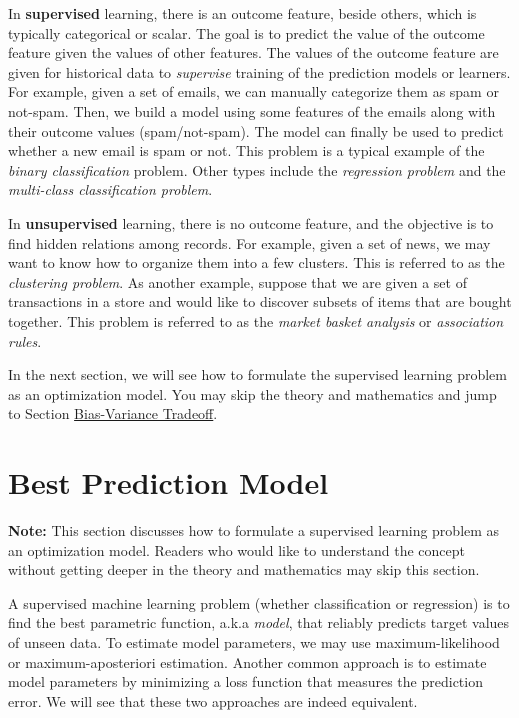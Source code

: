 \documentclass[11pt]{article}
\begin{document}
In \textbf{supervised} learning, there is an outcome feature, beside others, which is typically categorical or scalar. The goal is to predict the value of the outcome feature given the values of other features. The values of the outcome feature are given for historical data to \emph{supervise} training of the prediction models or learners. For example, given a set of emails, we can manually categorize them as spam or not-spam. Then, we build a model using some features of the emails along with their outcome values (spam/not-spam). The model can finally be used to predict whether a new email is spam or not. This problem is a typical example of the \emph{binary classification} problem. Other types include the \emph{regression problem} and the \emph{multi-class classification problem}.

In \textbf{unsupervised} learning, there is no outcome feature, and the objective is to find hidden relations among records. For example, given a set of news, we may want to know how to organize them into a few clusters. This is referred to as the \emph{clustering problem}. As another example, suppose that we are given a set of transactions in a store and would like to discover subsets of items that are bought together. This problem is referred to as the \emph{market basket analysis} or \emph{association rules}.

In the next section, we will see how to formulate the supervised learning problem as an optimization model. You may skip the theory and mathematics and jump to Section \hyperref[orgtarget2]{Bias-Variance Tradeoff}.

\section{Best Prediction Model}
\label{sec:orgheadline6}

\textbf{Note:} This section discusses how to formulate a supervised learning problem as an optimization model. Readers who would like to understand the concept without getting deeper in the theory and mathematics may skip this section.

A supervised machine learning problem (whether classification or regression) is to find the best parametric function, a.k.a \emph{model}, that reliably predicts target values of unseen data. To estimate model parameters, we may use maximum-likelihood or maximum-aposteriori estimation. Another common approach is to estimate model parameters by minimizing a loss function that measures the prediction error. We will see that these two approaches are indeed equivalent.
\end{document}
